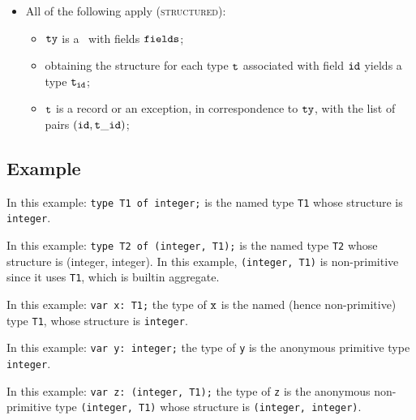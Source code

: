 \begin{itemize}
\begin{itemize}
  \end{itemize}
\item All of the following apply (\textsc{structured}):
  \begin{itemize}
  \item $\texttt{ty}$ is a \structuredtype\ with fields $\texttt{fields}$;
  \item obtaining the structure for each type $\texttt{t}$ associated with field $\texttt{id}$ yields a type $\texttt{t}_{\texttt{id}}$\ProseOrTypeError;
  \item $\texttt{t}$ is a record or an exception, in correspondence to $\texttt{ty}$, with the list of pairs $(\texttt{id}, \texttt{t}\_\texttt{id})$;
  \end{itemize}
\end{itemize}

\subsection{Example}
In this example:
\texttt{type T1 of integer;} is the named type \texttt{T1}
whose structure is \texttt{integer}.

In this example:
\texttt{type T2 of (integer, T1);}
is the named type \texttt{T2} whose structure is (integer, integer). In this
example, \texttt{(integer, T1)} is non-primitive since it uses \texttt{T1}, which is builtin aggregate.

In this example:
\texttt{var x: T1;}
the type of $\texttt{x}$ is the named (hence non-primitive) type \texttt{T1}, whose structure
is \texttt{integer}.

In this example:
\texttt{var y: integer;}
the type of \texttt{y} is the anonymous primitive type \texttt{integer}.

In this example:
\texttt{var z: (integer, T1);}
the type of \texttt{z} is the anonymous non-primitive type
\texttt{(integer, T1)} whose structure is \texttt{(integer, integer)}.


